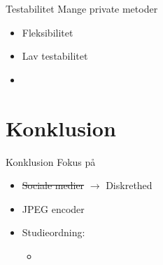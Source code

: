 \begin{frame}[fragile]{Testabilitet}
	Mange private metoder
	\begin{itemize}
		\item Fleksibilitet %
		\item Lav testabilitet
	\end{itemize}
	\begin{itemize}
		\item[]
	\end{itemize}
\end{frame}

\section{Konklusion}
\begin{frame}{Konklusion}
	Fokus på
	\begin{itemize}
		\item{\sout{Sociale medier} $\rightarrow$ Diskrethed}
		\item JPEG encoder
		\item Studieordning:
		\begin{itemize}
			\item[]
		\end{itemize}
	\end{itemize}
\end{frame}
